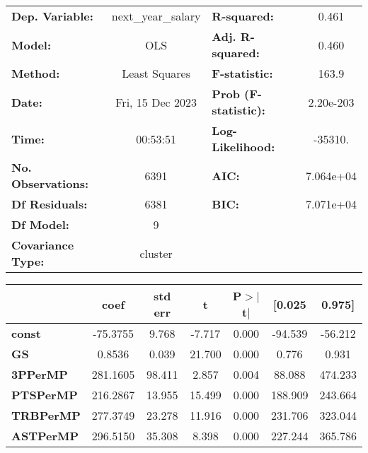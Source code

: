 \begin{center}
\begin{tabular}{lclc}
\toprule
\textbf{Dep. Variable:}    & next\_year\_salary & \textbf{  R-squared:         } &     0.461   \\
\textbf{Model:}            &        OLS         & \textbf{  Adj. R-squared:    } &     0.460   \\
\textbf{Method:}           &   Least Squares    & \textbf{  F-statistic:       } &     163.9   \\
\textbf{Date:}             &  Fri, 15 Dec 2023  & \textbf{  Prob (F-statistic):} & 2.20e-203   \\
\textbf{Time:}             &      00:53:51      & \textbf{  Log-Likelihood:    } &   -35310.   \\
\textbf{No. Observations:} &         6391       & \textbf{  AIC:               } & 7.064e+04   \\
\textbf{Df Residuals:}     &         6381       & \textbf{  BIC:               } & 7.071e+04   \\
\textbf{Df Model:}         &            9       & \textbf{                     } &             \\
\textbf{Covariance Type:}  &      cluster       & \textbf{                     } &             \\
\bottomrule
\end{tabular}
\begin{tabular}{lcccccc}
                       & \textbf{coef} & \textbf{std err} & \textbf{t} & \textbf{P$> |$t$|$} & \textbf{[0.025} & \textbf{0.975]}  \\
\midrule
\textbf{const}         &     -75.3755  &        9.768     &    -7.717  &         0.000        &      -94.539    &      -56.212     \\
\textbf{GS}            &       0.8536  &        0.039     &    21.700  &         0.000        &        0.776    &        0.931     \\
\textbf{3PPerMP}       &     281.1605  &       98.411     &     2.857  &         0.004        &       88.088    &      474.233     \\
\textbf{PTSPerMP}      &     216.2867  &       13.955     &    15.499  &         0.000        &      188.909    &      243.664     \\
\textbf{TRBPerMP}      &     277.3749  &       23.278     &    11.916  &         0.000        &      231.706    &      323.044     \\
\textbf{ASTPerMP}      &     296.5150  &       35.308     &     8.398  &         0.000        &      227.244    &      365.786     \\

\end{tabular}
\end{center}
